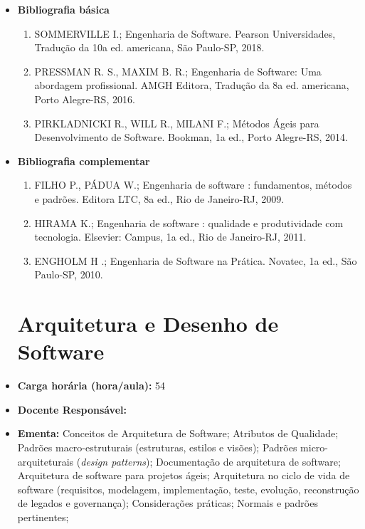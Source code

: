 \documentclass[11pt,fleqn]{book} %
\begin{document}
\begin{itemize}
	\item \textbf{Bibliografia básica}
	\begin{enumerate}
		\item SOMMERVILLE I.; Engenharia de Software. Pearson Universidades, Tradução da 10a ed. americana, São Paulo-SP, 2018.
		\item PRESSMAN R. S., MAXIM B. R.; Engenharia de Software: Uma abordagem profissional. AMGH Editora, Tradução da 8a ed. americana, Porto Alegre-RS, 2016.
		\item PIRKLADNICKI R., WILL R., MILANI F.; Métodos Ágeis para Desenvolvimento de Software. Bookman, 1a ed., Porto Alegre-RS, 2014.
	\end{enumerate}
	\item \textbf{Bibliografia complementar}
	\begin{enumerate}
		\item FILHO P., PÁDUA W.; Engenharia de software : fundamentos, métodos e padrões. Editora LTC, 8a ed., Rio de Janeiro-RJ, 2009.
		\item HIRAMA K.; Engenharia de software : qualidade e produtividade com tecnologia. Elsevier: Campus, 1a ed., Rio de Janeiro-RJ, 2011.
		\item ENGHOLM H .; Engenharia de Software na Prática. Novatec, 1a ed., São Paulo-SP, 2010.
	
	\end{enumerate} 
	
	


\newpage
\section{Arquitetura e Desenho de Software}\label{disc:arquitetura_de_software}
	
	\item \textbf{Carga horária (hora/aula):} 54
	\item \textbf{Docente Responsável:}~
	\item \textbf{Ementa:} 
    Conceitos de Arquitetura de Software;
    Atributos de Qualidade;
    Padrões macro-estruturais (estruturas, estilos e visões);
    Padrões micro-arquiteturais (\textit{design patterns});
    Documentação de arquitetura de software;
    Arquitetura de software para projetos ágeis;
	Arquitetura no ciclo de vida de software (requisitos, modelagem, implementação, teste, evolução, reconstrução de legados e governança);
	Considerações práticas;
	Normais e padrões pertinentes;
	

\end{itemize}
\end{document}
